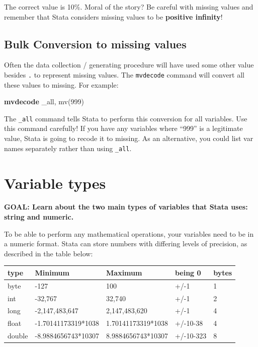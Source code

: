 \documentclass[
]{book}
\newenvironment{Shaded}{\begin{snugshade}}{\end{snugshade}}
\newcommand{\DataTypeTok}[1]{\textcolor[rgb]{0.13,0.29,0.53}{#1}}
\newcommand{\KeywordTok}[1]{\textcolor[rgb]{0.13,0.29,0.53}{\textbf{#1}}}
\newcommand{\NormalTok}[1]{#1}
\begin{document}
The correct value is 10\%. Moral of the story? Be careful with missing values and remember that Stata considers missing values to be \textbf{positive infinity}!

\hypertarget{bulk-conversion-to-missing-values}{%
\subsection{Bulk Conversion to missing values}\label{bulk-conversion-to-missing-values}}

Often the data collection / generating procedure will have used some other value besides \texttt{.} to represent missing values. The \texttt{mvdecode} command will convert all these values to missing. For example:

\begin{Shaded}
\begin{Highlighting}[]
\KeywordTok{mvdecode} \DataTypeTok{\_all}\NormalTok{, mv(999)}
\end{Highlighting}
\end{Shaded}

The \texttt{\_all} command tells Stata to perform this conversion for all variables. Use this command carefully! If you have any variables where ``999'' is a legitimate value, Stata is going to recode it to missing. As an alternative, you could list var names separately rather than using \texttt{\_all}.

\hypertarget{variable-types}{%
\section{Variable types}\label{variable-types}}

\begin{alert}

\textbf{GOAL: Learn about the two main types of variables that Stata uses: string and numeric.}

\end{alert}

To be able to perform any mathematical operations, your variables need to be in a numeric format. Stata can store numbers with differing levels of precision, as described in the table below:

\begin{longtable}[]{@{}lllll@{}}
\toprule
type & Minimum & Maximum & being 0 & bytes\tabularnewline
\midrule
\endhead
byte & -127 & 100 & +/-1 & 1\tabularnewline
int & -32,767 & 32,740 & +/-1 & 2\tabularnewline
long & -2,147,483,647 & 2,147,483,620 & +/-1 & 4\tabularnewline
float & -1.70141173319*1038 & 1.70141173319*1038 & +/-10-38 & 4\tabularnewline
double & -8.9884656743*10307 & 8.9884656743*10307 & +/-10-323 & 8\tabularnewline
\bottomrule
\end{longtable}
\end{document}

